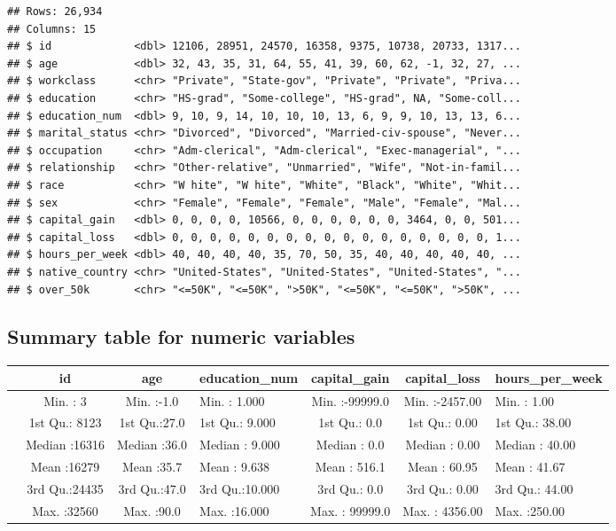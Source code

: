 \documentclass[]{article}
\newenvironment{Shaded}{\begin{snugshade}}{\end{snugshade}}
\newcommand{\KeywordTok}[1]{\textcolor[rgb]{0.13,0.29,0.53}{\textbf{#1}}}
\newcommand{\NormalTok}[1]{#1}
\newcommand{\OperatorTok}[1]{\textcolor[rgb]{0.81,0.36,0.00}{\textbf{#1}}}
\newcommand{\StringTok}[1]{\textcolor[rgb]{0.31,0.60,0.02}{#1}}
\begin{document}
\begin{verbatim}
## Rows: 26,934
## Columns: 15
## $ id             <dbl> 12106, 28951, 24570, 16358, 9375, 10738, 20733, 1317...
## $ age            <dbl> 32, 43, 35, 31, 64, 55, 41, 39, 60, 62, -1, 32, 27, ...
## $ workclass      <chr> "Private", "State-gov", "Private", "Private", "Priva...
## $ education      <chr> "HS-grad", "Some-college", "HS-grad", NA, "Some-coll...
## $ education_num  <dbl> 9, 10, 9, 14, 10, 10, 10, 13, 6, 9, 9, 10, 13, 13, 6...
## $ marital_status <chr> "Divorced", "Divorced", "Married-civ-spouse", "Never...
## $ occupation     <chr> "Adm-clerical", "Adm-clerical", "Exec-managerial", "...
## $ relationship   <chr> "Other-relative", "Unmarried", "Wife", "Not-in-famil...
## $ race           <chr> "W hite", "W hite", "White", "Black", "White", "Whit...
## $ sex            <chr> "Female", "Female", "Female", "Male", "Female", "Mal...
## $ capital_gain   <dbl> 0, 0, 0, 0, 10566, 0, 0, 0, 0, 0, 0, 3464, 0, 0, 501...
## $ capital_loss   <dbl> 0, 0, 0, 0, 0, 0, 0, 0, 0, 0, 0, 0, 0, 0, 0, 0, 0, 1...
## $ hours_per_week <dbl> 40, 40, 40, 40, 35, 70, 50, 35, 40, 40, 40, 40, 40, ...
## $ native_country <chr> "United-States", "United-States", "United-States", "...
## $ over_50k       <chr> "<=50K", "<=50K", ">50K", "<=50K", "<=50K", ">50K", ...
\end{verbatim}

\newpage

\hypertarget{summary-table-for-numeric-variables}{%
\subsection{Summary table for numeric
variables}\label{summary-table-for-numeric-variables}}

\begin{Shaded}
\end{Shaded}

\begin{longtable}[]{@{}lcclccl@{}}
\toprule
& id & age & education\_num & capital\_gain & capital\_loss &
hours\_per\_week\tabularnewline
\midrule
\endhead
& Min. : 3 & Min. :-1.0 & Min. : 1.000 & Min. :-99999.0 & Min. :-2457.00
& Min. : 1.00\tabularnewline
& 1st Qu.: 8123 & 1st Qu.:27.0 & 1st Qu.: 9.000 & 1st Qu.: 0.0 & 1st
Qu.: 0.00 & 1st Qu.: 38.00\tabularnewline
& Median :16316 & Median :36.0 & Median : 9.000 & Median : 0.0 & Median
: 0.00 & Median : 40.00\tabularnewline
& Mean :16279 & Mean :35.7 & Mean : 9.638 & Mean : 516.1 & Mean : 60.95
& Mean : 41.67\tabularnewline
& 3rd Qu.:24435 & 3rd Qu.:47.0 & 3rd Qu.:10.000 & 3rd Qu.: 0.0 & 3rd
Qu.: 0.00 & 3rd Qu.: 44.00\tabularnewline
& Max. :32560 & Max. :90.0 & Max. :16.000 & Max. : 99999.0 & Max. :
4356.00 & Max. :250.00\tabularnewline
\bottomrule
\end{longtable}
\end{document}
